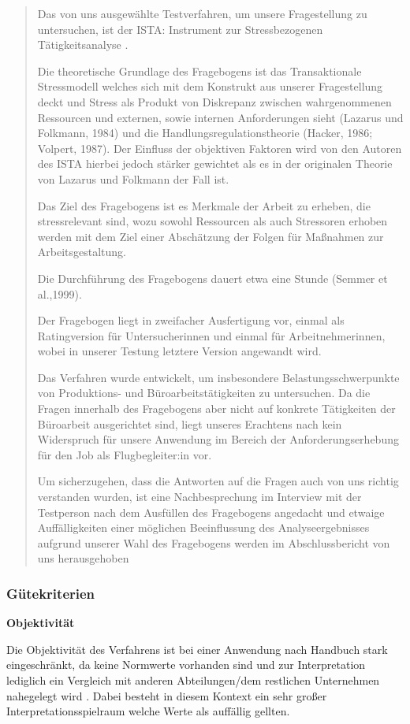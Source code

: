 \documentclass[12pt, a4paper]{article}
\begin{document}
\blockquote{
\tiny    
Das von uns ausgewählte Testverfahren, um unsere Fragestellung zu untersuchen, 
ist der ISTA: Instrument zur Stressbezogenen Tätigkeitsanalyse 
\parencite{semmerISTAInstrumentZur1998}. 

Die theoretische Grundlage des Fragebogens ist das Transaktionale Stressmodell 
welches sich mit dem Konstrukt aus unserer Fragestellung deckt und Stress
als Produkt von Diskrepanz zwischen wahrgenommenen Ressourcen und externen, 
sowie internen Anforderungen sieht (Lazarus und  Folkmann, 1984) 
und die Handlungsregulationstheorie (Hacker, 1986; Volpert,
1987). 
Der Einfluss der objektiven Faktoren wird von den Autoren des ISTA hierbei jedoch
stärker gewichtet als es in der originalen Theorie von Lazarus und Folkmann der Fall ist.

Das Ziel des Fragebogens ist es Merkmale der Arbeit zu erheben, die stressrelevant sind,
wozu sowohl Ressourcen als auch Stressoren erhoben werden mit dem Ziel einer
Abschätzung der Folgen für Maßnahmen zur Arbeitsgestaltung. 

Die Durchführung des Fragebogens dauert etwa eine Stunde (Semmer et al.,1999).

Der Fragebogen liegt in zweifacher Ausfertigung vor, einmal als Ratingversion für
Untersucherinnen und einmal für Arbeitnehmerinnen, wobei in unserer Testung letztere
Version angewandt wird. 

Das Verfahren wurde entwickelt, um insbesondere
Belastungsschwerpunkte von Produktions- und Büroarbeitstätigkeiten zu untersuchen. Da
die Fragen innerhalb des Fragebogens aber nicht auf konkrete Tätigkeiten der Büroarbeit
ausgerichtet sind, liegt unseres Erachtens nach kein Widerspruch für unsere Anwendung im
Bereich der Anforderungserhebung für den Job als Flugbegleiter:in vor. 

Um sicherzugehen,
dass die Antworten auf die Fragen auch von uns richtig verstanden wurden, ist eine
Nachbesprechung im Interview mit der Testperson nach dem Ausfüllen des Fragebogens
angedacht und etwaige Auffälligkeiten einer möglichen Beeinflussung des
Analyseergebnisses aufgrund unserer Wahl des Fragebogens werden im Abschlussbericht
von uns herausgehoben}

\subsubsection*{Gütekriterien}

\textbf{Objektivität}

Die Objektivität des Verfahrens ist bei einer Anwendung nach Handbuch stark eingeschränkt, da keine Normwerte vorhanden sind und zur 
Interpretation lediglich ein Vergleich mit anderen Abteilungen/dem restlichen Unternehmen nahegelegt wird 
\parencite{semmerInstrumentZurStressbezogenen1999}. 
Dabei besteht in diesem Kontext ein sehr großer Interpretationsspielraum welche Werte als auffällig gellten. 
\end{document}
